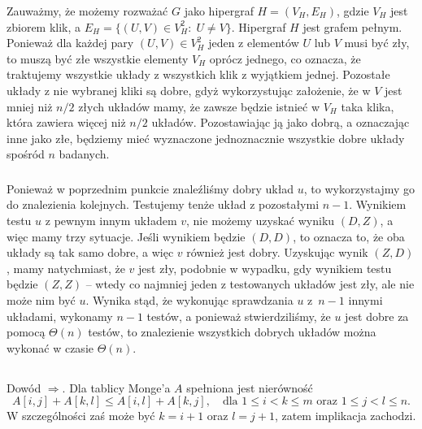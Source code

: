 Zauważmy, że możemy rozważać $G$ jako hipergraf $H=(V_H,E_H)$, gdzie $V_H$ jest zbiorem klik, a $E_H=\{(U,V)\in V_H^2:\;U\ne V\}$. Hipergraf $H$ jest grafem pełnym. Ponieważ dla każdej pary $(U,V)\in V_H^2$ jeden z elementów $U$ lub $V$ musi być zły, to muszą być złe wszystkie elementy $V_H$ oprócz jednego, co oznacza, że traktujemy wszystkie układy z wszystkich klik z wyjątkiem jednej. Pozostałe układy z nie wybranej kliki są dobre, gdyż wykorzystując założenie, że w $V$ jest mniej niż $n/2$ złych układów mamy, że zawsze będzie istnieć w $V_H$ taka klika, która zawiera więcej niż $n/2$ układów. Pozostawiając ją jako dobrą, a oznaczając inne jako złe, będziemy mieć wyznaczone jednoznacznie wszystkie dobre układy spośród $n$ badanych.

\subsubsection{} %

\subsubsection{} %
Ponieważ w poprzednim punkcie znaleźliśmy dobry układ $u$, to wykorzystajmy go do znalezienia kolejnych. Testujemy tenże układ z pozostałymi $n-1$. Wynikiem testu $u$ z pewnym innym układem $v$, nie możemy uzyskać wyniku $(D,Z)$, a więc mamy trzy sytuacje. Jeśli wynikiem będzie $(D,D)$, to oznacza to, że oba układy są tak samo dobre, a więc $v$ również jest dobry. Uzyskując wynik $(Z,D)$, mamy natychmiast, że $v$ jest zły, podobnie w wypadku, gdy wynikiem testu będzie $(Z,Z)$ -- wtedy co najmniej jeden z testowanych układów jest zły, ale nie może nim być $u$. Wynika stąd, że wykonując sprawdzania $u$ z~$n-1$ innymi układami, wykonamy $n-1$ testów, a ponieważ stwierdziliśmy, że $u$ jest dobre za pomocą $\Theta(n)$ testów, to znalezienie wszystkich dobrych układów można wykonać w czasie $\Theta(n)$.

\subsection{} %

\subsubsection{} %
Dowód $\Rightarrow$. Dla tablicy Monge'a $A$ spełniona jest nierówność
\[
	A[i,j]+A[k,l]\le A[i,l]+A[k,j],\quad\mbox{dla }1\le i<k\le m\mbox{ oraz }1\le j<l\le n.
\]
W szczególności zaś może być $k=i+1$ oraz $l=j+1$, zatem implikacja zachodzi.

